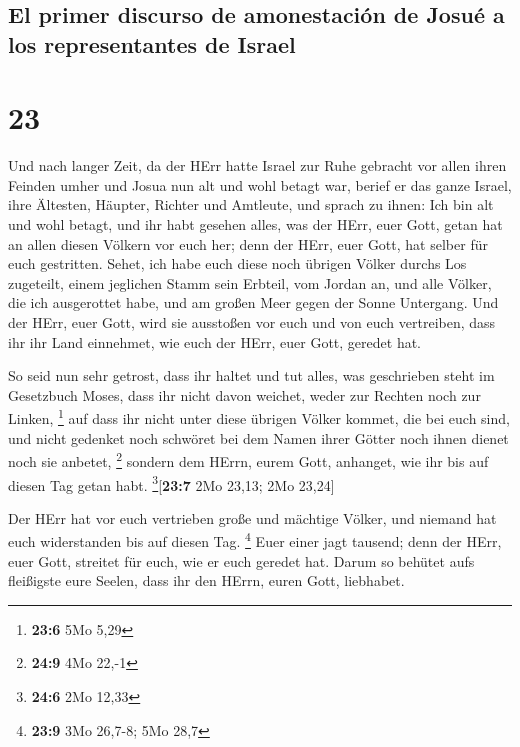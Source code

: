 \hypertarget{el-primer-discurso-de-amonestaciuxf3n-de-josuuxe9-a-los-representantes-de-israel}{%
\subsection{El primer discurso de amonestación de Josué a los
representantes de
Israel}\label{el-primer-discurso-de-amonestaciuxf3n-de-josuuxe9-a-los-representantes-de-israel}}

\hypertarget{section-22}{%
\section{23}\label{section-22}}

 Und nach langer Zeit, da der HErr hatte Israel zur Ruhe
gebracht vor allen ihren Feinden umher und Josua nun alt und wohl betagt
war,  berief er das ganze Israel, ihre Ältesten, Häupter,
Richter und Amtleute, und sprach zu ihnen: Ich bin alt und wohl betagt,
 und ihr habt gesehen alles, was der HErr, euer Gott,
getan hat an allen diesen Völkern vor euch her; denn der HErr, euer
Gott, hat selber für euch gestritten.  Sehet, ich habe
euch diese noch übrigen Völker durchs Los zugeteilt, einem jeglichen
Stamm sein Erbteil, vom Jordan an, und alle Völker, die ich ausgerottet
habe, und am großen Meer gegen der Sonne Untergang.  Und
der HErr, euer Gott, wird sie ausstoßen vor euch und von euch
vertreiben, dass ihr ihr Land einnehmet, wie euch der HErr, euer Gott,
geredet hat.

 So seid nun sehr getrost, dass ihr haltet und tut alles,
was geschrieben steht im Gesetzbuch Moses, dass ihr nicht davon weichet,
weder zur Rechten noch zur Linken, \footnote{\textbf{23:6} 5Mo 5,29}
 auf dass ihr nicht unter diese übrigen Völker kommet, die
bei euch sind, und nicht gedenket noch schwöret bei dem Namen ihrer
Götter noch ihnen dienet noch sie anbetet, \footnote{\textbf{24:9} 4Mo
  22,-1}  sondern dem HErrn, eurem Gott, anhanget, wie ihr
bis auf diesen Tag getan habt. \footnote{\textbf{24:6} 2Mo 12,33}{[}\textbf{23:7}
2Mo 23,13; 2Mo 23,24{]}

 Der HErr hat vor euch vertrieben große und mächtige
Völker, und niemand hat euch widerstanden bis auf diesen Tag.
\footnote{\textbf{23:9} 3Mo 26,7-8; 5Mo 28,7}  Euer einer
jagt tausend; denn der HErr, euer Gott, streitet für euch, wie er euch
geredet hat.  Darum so behütet aufs fleißigste eure
Seelen, dass ihr den HErrn, euren Gott, liebhabet.

